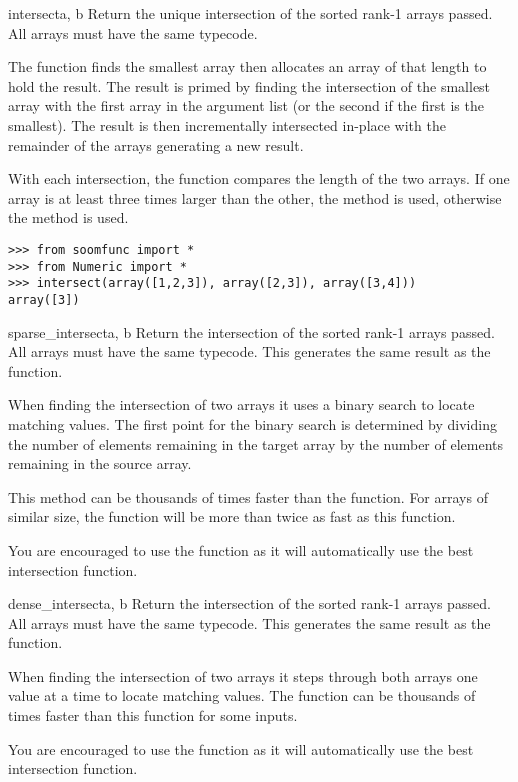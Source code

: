\begin{funcdesc}{intersect}{a, b \optional{, \ldots}}
Return the unique intersection of the sorted rank-1 arrays passed.
All arrays must have the same typecode.

The function finds the smallest array then allocates an array of that
length to hold the result.  The result is primed by finding the
intersection of the smallest array with the first array in the
argument list (or the second if the first is the smallest).  The
result is then incrementally intersected in-place with the remainder
of the arrays generating a new result.

With each intersection, the function compares the length of the two
arrays.  If one array is at least three times larger than the other,
the  method is used, otherwise the
 method is used.

\begin{verbatim}
>>> from soomfunc import * 
>>> from Numeric import *
>>> intersect(array([1,2,3]), array([2,3]), array([3,4]))
array([3])
\end{verbatim}
\end{funcdesc}

\begin{funcdesc}{sparse_intersect}{a, b \optional{, \ldots}}
Return the intersection of the sorted rank-1 arrays passed.  All
arrays must have the same typecode.  This generates the same result as
the  function.

When finding the intersection of two arrays it uses a binary search to
locate matching values.  The first point for the binary search is
determined by dividing the number of elements remaining in the target
array by the number of elements remaining in the source array.

This method can be thousands of times faster than the
 function.  For arrays of similar size,
the  function will be more than twice as
fast as this function.

You are encouraged to use the  function as it
will automatically use the best intersection function.
\end{funcdesc}

\begin{funcdesc}{dense_intersect}{a, b \optional{, \ldots}}
Return the intersection of the sorted rank-1 arrays passed.  All
arrays must have the same typecode.  This generates the same result as
the  function.

When finding the intersection of two arrays it steps through both
arrays one value at a time to locate matching values.  The
 function can be thousands of times
faster than this function for some inputs.

You are encouraged to use the  function as it
will automatically use the best intersection function.
\end{funcdesc}

